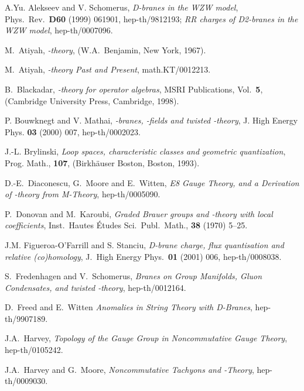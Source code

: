 \documentclass[a4paper,reqno]{amsart}
\theoremstyle{plain}
\theoremstyle{definition}
\theoremstyle{remark}
\numberwithin{equation}{section}
\numberwithin{figure}{section}
\providecommand{\<}{\langle}
\renewcommand{\>}{\rangle}
\begin{document}
\begin{thebibliography}{99}

A.Yu. Alekseev and V. Schomerus, {\it D-branes in the WZW model},
Phys.\ Rev.\ {\bf D60} (1999) 061901, hep-th/9812193;
{\it RR charges of D2-branes in the WZW model}, hep-th/0007096.

M.~Atiyah, {\it {}\coordHE{}-theory},
(W.A.~Benjamin, New York, 1967).

M.~Atiyah, {\it {}\coordHE{}-theory Past and Present},
math.KT/0012213.

B.~Blackadar,
{\it {}\coordHE{}-theory for operator algebras},
MSRI Publications, Vol.\ {\bf 5},
(Cambridge University Press, Cambridge, 1998).

P. Bouwknegt and V. Mathai,
{\it {}\coordHE{}-branes, \coordHE{}-fields and twisted \coordHE{}-theory},
J. High Energy Phys. {\bf 03} (2000) 007, hep-th/0002023.

J.-L. Brylinski, {\it Loop spaces, characteristic classes and
geometric quantization},
Prog. Math., {\bf 107}, (Birkh\"auser Boston, Boston, 1993).

D.-E.~Diaconescu, G.~Moore and E.~Witten,
{\it E8 Gauge Theory, and a Derivation of \coordHE{}-theory from M-Theory},
hep-th/0005090.


 P.~Donovan and M.~Karoubi, {\em Graded Brauer
groups and \coordHE{}-theory with local coefficients}, Inst.\ Hautes
\'Etudes Sci.\ Publ.\ Math., {\bf 38} (1970) 5--25.


J.M. Figueroa-O'Farrill and S. Stanciu,
{\it D-brane charge, flux quantisation and relative (co)homology},
J.\ High Energy Phys.\ {\bf 01} (2001) 006, hep-th/0008038.

S.~Fredenhagen and V.~Schomerus,
{\it Branes on Group Manifolds, Gluon Condensates, and twisted \coordHE{}-theory},
hep-th/0012164.

D.~Freed and E.~Witten
{\it Anomalies in String Theory with D-Branes}, hep-th/9907189.

J.A.~Harvey,
{\it Topology of the Gauge Group in Noncommutative Gauge Theory},
hep-th/0105242.

J.A.~Harvey and G.~Moore,
{\it Noncommutative Tachyons and \coordHE{}-Theory}, hep-th/0009030.


\end{thebibliography}
\end{document}
